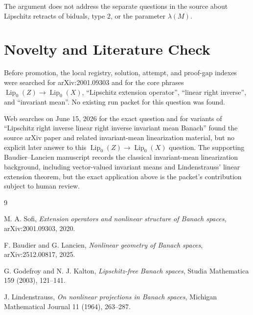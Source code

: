 \documentclass[11pt]{article}
\newcommand{\Lipz}{\operatorname{Lip}_0}
\begin{document}
The argument does not address the separate questions in the source about
Lipschitz retracts of biduals, type \(2\), or the parameter \(\lambda(M)\).

\section*{Novelty and Literature Check}

Before promotion, the local registry, solution, attempt, and proof-gap indexes
were searched for arXiv:2001.09303 and for the core phrases
\(\Lipz(Z)\to\Lipz(X)\), ``Lipschitz extension operator'', ``linear right
inverse'', and ``invariant mean''. No existing run packet for this question was
found.

Web searches on June 15, 2026 for the exact question and for variants of
``Lipschitz right inverse linear right inverse invariant mean Banach'' found
the source arXiv paper and related invariant-mean linearization material, but
no explicit later answer to this \(\Lipz(Z)\to\Lipz(X)\) question. The
supporting Baudier--Lancien manuscript records the classical invariant-mean
linearization background, including vector-valued invariant means and
Lindenstrauss' linear extension theorem, but the exact application above is
the packet's contribution subject to human review.

\begin{thebibliography}{9}

M. A. Sofi,
\emph{Extension operators and nonlinear structure of Banach spaces},
arXiv:2001.09303, 2020.

F. Baudier and G. Lancien,
\emph{Nonlinear geometry of Banach spaces},
arXiv:2512.00817, 2025.

G. Godefroy and N. J. Kalton,
\emph{Lipschitz-free Banach spaces},
Studia Mathematica 159 (2003), 121--141.

J. Lindenstrauss,
\emph{On nonlinear projections in Banach spaces},
Michigan Mathematical Journal 11 (1964), 263--287.

\end{thebibliography}
\end{document}
